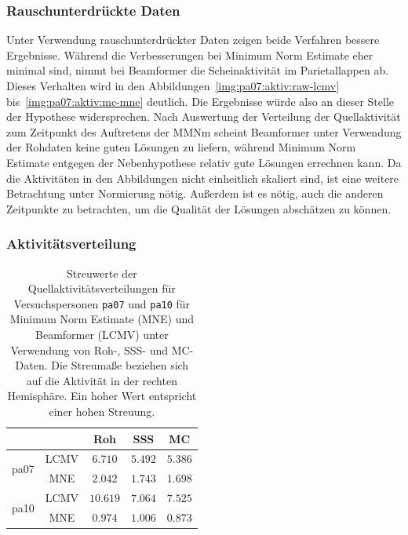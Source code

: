 \documentclass[doc,a4paper,12pt]{apa6}
\renewcommand{\arraystretch}{1.2}
\begin{document}
\subsubsection{Rauschunterdrückte Daten}

Unter Verwendung rauschunterdrückter Daten zeigen beide Verfahren bessere Ergebnisse. Während die Verbesserungen bei Minimum Norm Estimate eher minimal sind, nimmt bei Beamformer die Scheinaktivität im Parietallappen ab. Dieses Verhalten wird in den Abbildungen~\ref{img:pa07:aktiv:raw-lcmv} bis~\ref{img:pa07:aktiv:mc-mne} deutlich. Die Ergebnisse würde also an dieser Stelle der Hypothese widersprechen. Nach Auswertung der Verteilung der Quellaktivität zum Zeitpunkt des Auftretens der MMNm scheint Beamformer unter Verwendung der Rohdaten keine guten Lösungen zu liefern, während Minimum Norm Estimate entgegen der Nebenhypothese relativ gute Lösungen errechnen kann. Da die Aktivitäten in den Abbildungen nicht einheitlich skaliert sind, ist eine weitere Betrachtung unter Normierung nötig. Außerdem ist es nötig, auch die anderen Zeitpunkte zu betrachten, um die Qualität der Lösungen abschätzen zu können.

\subsubsection{Aktivitätsverteilung}
\label{sec:akti-verteilung}

\begin{table}[t]
  \caption{}
  \label{tab:distribution}
  \vspace*{3mm}
  \centering
  \setlength{\tabcolsep}{1cm}
  \renewcommand{\arraystretch}{1.5}
  \begin{tabular}{ccccc}
  \hline
  & & Roh & SSS & MC\\
  \hline
  \multirow{2}{*}{pa07} & LCMV & $6.710$ & $5.492$ & $5.386$\\
  & MNE & $2.042$ & $1.743$ & $1.698$\\
  \hline
  \multirow{2}{*}{pa10} & LCMV & $10.619$ & $7.064$ & $7.525$\\
  & MNE & $0.974$ & $1.006$ & $0.873$\\
  \hline
  \end{tabular}
  \vspace*{3mm}
  \caption*{Streuwerte der Quellaktivitätsverteilungen für Versuchspersonen \texttt{pa07} und \texttt{pa10} für Minimum Norm Estimate (MNE) und Beamformer (LCMV) unter Verwendung von Roh-, SSS- und MC-Daten. Die Streumaße beziehen sich auf die Aktivität in der rechten Hemisphäre. Ein hoher Wert entspricht einer hohen Streuung.}
\end{table}
\end{document}
